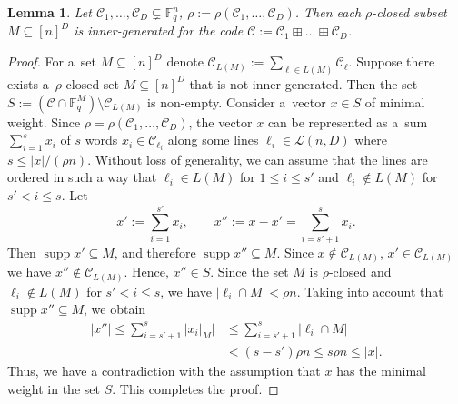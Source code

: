 \documentclass[conference]{IEEEtran}
\newcommand{\bigabsbr}[1]{\bigl|#1\bigr|}
\let\le\leqslant
\theoremstyle{plain}
\newtheorem{lemma}[theorem]{Lemma}
\theoremstyle{definition}
\theoremstyle{remark}
\newcommand{\cC}{\mathcal{C}}
\newcommand{\cL}{\mathcal{L}}
\newcommand{\F}{\mathbb{F}}
\DeclareMathOperator{\supp}{supp}
\begin{document}
\begin{lemma}\label{lemma:inner-generated}
 Let $\cC_1,\dots,\cC_D\subsetneq \F_q^n$, $\rho:=\rho(\cC_1,\dots,\cC_D)$. Then each $\rho$-closed subset $M\subseteq [n]^D$ is inner-generated for the code $\cC:=\cC_1\boxplus\ldots\boxplus\cC_D$.
\end{lemma}
\begin{proof}
    For a~set $M\subseteq [n]^D$ denote $\cC_{L(M)}:=\sum_{\ell\in L(M)}\cC_\ell$.
    Suppose there exists a~$\rho$-closed set $M\subseteq[n]^D$ that is not inner-generated. 
    Then the set $S:=(\cC\cap \F_q^M)\setminus \cC_{L(M)}$ is non-empty.
    Consider a~vector $x\in S$ of minimal weight. 
    Since $\rho=\rho(\cC_1,\dots,\cC_D)$, the vector $x$ can be represented as a~sum $\sum_{i=1}^s x_i$ of $s$ words $x_i\in\cC_{\ell_i}$ along some lines $\ell_i\in\cL(n,D)$ where $s\le |x|/(\rho n)$. 
    Without loss of generality, we can assume that the lines are ordered in such a way that $\ell_i\in L(M)$ for $1\le i\le s'$ and $\ell_i\not\in L(M)$ for $s'<i\le s$. 
    Let \[
        x':=\sum_{i=1}^{s'} x_i,\qquad x'':=x-x'=\sum_{i=s'+1}^s x_i.
    \] 
    Then $\supp x'\subseteq M$, and therefore $\supp x''\subseteq M$. 
    Since ${x\not\in\cC_{L(M)}}$, $x'\in \cC_{L(M)}$ we have $x''\not\in \cC_{L(M)}$. 
    Hence, $x''\in S$. 
    Since the set $M$ is $\rho$-closed and $\ell_i\not\in L(M)$ for $s'<i\le s$, we have $|\ell_i\cap M|<\rho n$. 
    Taking into account that $\supp x''\subseteq M$, we obtain
    \begin{align*}
    |x''|\le\sum_{i=s'+1}^{s}\bigabsbr{x_i|_{M}} 
    &\le \sum_{i=s'+1}^{s}|\ell_i\cap M|\\
    &< (s-s')\rho n
    \le s\rho n\le |x|. 
    \end{align*}
    Thus, we have a contradiction with the assumption that $x$ has the minimal weight in the set $S$. This completes the proof.
\end{proof}
\end{document}
